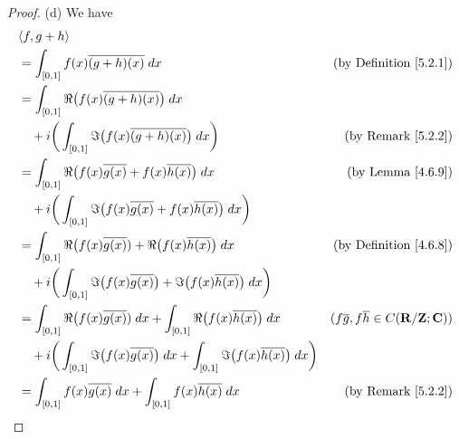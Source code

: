 \begin{proof}{(d)}
    We have
    \begin{align*}
         & \inner*{f, g + h}                                                                                                                                                                          \\
         & = \int_{[0, 1]} f(x) \overline{(g + h)(x)} \; dx                                                                                    & \text{(by Definition \ref{5.2.1})}                   \\
         & = \int_{[0, 1]} \Re\big(f(x) \overline{(g + h)(x)}\big) \; dx                                                                                                                              \\
         & \quad + i \bigg(\int_{[0, 1]} \Im\big(f(x) \overline{(g + h)(x)}\big) \; dx\bigg)                                                   & \text{(by Remark \ref{5.2.2})}                       \\
         & = \int_{[0, 1]} \Re\big(f(x) \overline{g(x)} + f(x) \overline{h(x)}\big) \; dx                                                      & \text{(by Lemma \ref{4.6.9})}                        \\
         & \quad + i \bigg(\int_{[0, 1]} \Im\big(f(x) \overline{g(x)} + f(x) \overline{h(x)}\big) \; dx\bigg)                                                                                         \\
         & = \int_{[0, 1]} \Re\big(f(x) \overline{g(x)}) + \Re\big(f(x) \overline{h(x)}\big) \; dx                                             & \text{(by Definition \ref{4.6.8})}                   \\
         & \quad + i \bigg(\int_{[0, 1]} \Im\big(f(x) \overline{g(x)}\big) + \Im\big(f(x) \overline{h(x)}\big) \; dx\bigg)                                                                            \\
         & = \int_{[0, 1]} \Re\big(f(x) \overline{g(x)}) \; dx + \int_{[0, 1]} \Re\big(f(x) \overline{h(x)}\big) \; dx                         & (f \overline{g}, f \overline{h} \in C(\R / \Z ; \C)) \\
         & \quad + i \bigg(\int_{[0, 1]} \Im\big(f(x) \overline{g(x)}\big) \; dx + \int_{[0, 1]} \Im\big(f(x) \overline{h(x)}\big) \; dx\bigg)                                                        \\
         & = \int_{[0, 1]} f(x) \overline{g(x)} \; dx + \int_{[0, 1]} f(x) \overline{h(x)} \; dx                                               & \text{(by Remark \ref{5.2.2})}                       \\

\end{align*}
\end{proof}
